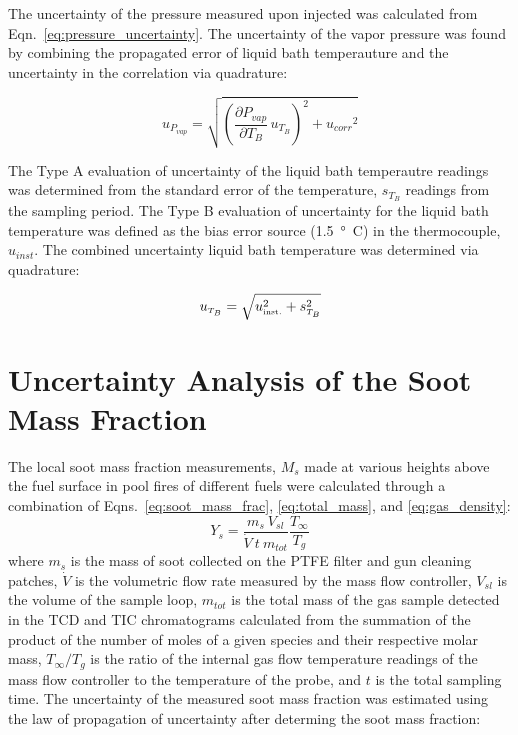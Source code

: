\documentclass[12pt]{article}
\begin{document}
The uncertainty of the pressure measured upon injected was calculated from Eqn.~\ref{eq:pressure_uncertainty}. The uncertainty of the vapor pressure was found by combining the propagated error of liquid bath temperauture and the uncertainty in the correlation via quadrature:

\begin{equation}
\label{eq:vapor_concentration_uncertainty}
u_{\scriptscriptstyle P_{vap}} = \sqrt{{\left(\frac{\partial P_{vap}}{\partial T_{B}}\,u_{\scriptscriptstyle T_{B}} \right)}^2+{u_{corr}}^2}
\end{equation}

The Type A evaluation of uncertainty of the liquid bath temperautre readings was determined from the standard error of the temperature, $s_{T_{B}}$ readings from the sampling period. The Type B evaluation of uncertainty for the liquid bath temperature was defined as the bias error source (\SI{1.5}{\degree C}) in the thermocouple, $u_{inst}$. The combined uncertainty liquid bath temperature was determined via quadrature:

\begin{equation}
\label{eq:temp_bath_uncertainty}
u_{\scriptscriptstyle T_{B}} = \sqrt{u_{\rm \scriptscriptstyle inst.}^2 + s_{\scriptscriptstyle T_{B}}^2}
\end{equation}
\pagebreak

\section{Uncertainty Analysis of the Soot Mass Fraction} \label{sec:Uncertainty_Soot_Frac}
The local soot mass fraction measurements, $M_{s}$ made at various heights above the fuel surface in pool fires of different fuels were calculated through a combination of Eqns.~\ref{eq:soot_mass_frac}, \ref{eq:total_mass}, and \ref{eq:gas_density}:
\begin{equation}\label{eq:overall_soot_mass_frac}
Y_{s}= \frac{m_{s}~V_{sl}}{\dot{V}~t~m_{tot}}\frac{T_{\infty}}{T_{g}}
\end{equation}
where $m_{s}$ is the mass of soot collected on the PTFE filter and gun cleaning patches, $\dot{V}$ is the volumetric flow rate measured by the mass flow controller, $V_{sl}$ is the volume of the sample loop, $m_{tot}$ is the total mass of the gas sample detected in the TCD and TIC chromatograms calculated from the summation of the product of the number of moles of a given species and their respective molar mass, $T_{\infty}/T_{g}$ is the ratio of the internal gas flow temperature readings of the mass flow controller to the temperature of the probe, and $t$ is the total sampling time. The uncertainty of the measured soot mass fraction was estimated using the law of propagation of uncertainty after determing the soot mass fraction:
\end{document}

